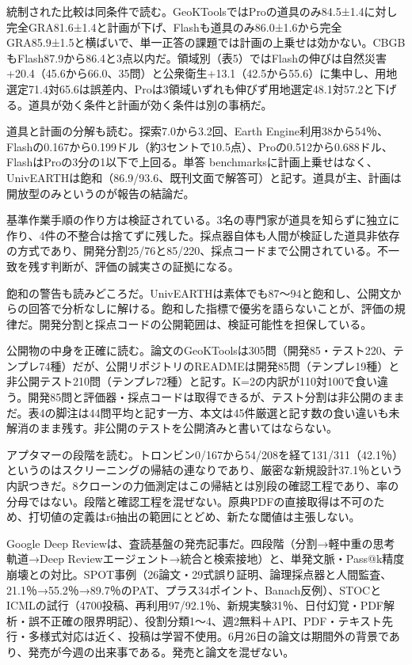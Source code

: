 \documentclass[lualatex,a4paper,10pt]{jlreq}
\begin{document}
統制された比較は同条件で読む。GeoKToolsではProの道具のみ84.5±1.4に対し完全GRA81.6±1.4と計画が下げ、Flashも道具のみ86.0±1.6から完全GRA85.9±1.5と横ばいで、単一正答の課題では計画の上乗せは効かない。CBGBもFlash87.9から86.4と3点以内だ。領域別（表5）ではFlashの伸びは自然災害+20.4（45.6から66.0、35問）と公衆衛生+13.1（42.5から55.6）に集中し、用地選定71.4対65.6は誤差内、Proは3領域いずれも伸びず用地選定48.1対57.2と下げる。道具が効く条件と計画が効く条件は別の事柄だ。
\cite{B47,B84,B48}


道具と計画の分解も読む。探索7.0から3.2回、Earth Engine利用38から54％、Flashの0.167から0.199ドル（約3セントで10.5点）、Proの0.512から0.688ドル、FlashはProの3分の1以下で上回る。単答 benchmarksに計画上乗せはなく、UnivEARTHは飽和（86.9/93.6、既刊文面で解答可）と記す。道具が主、計画は開放型のみというのが報告の結論だ。
\cite{B47,B84,B48}


基準作業手順の作り方は検証されている。3名の専門家が道具を知らずに独立に作り、4件の不整合は捨てずに残した。採点器自体も人間が検証した道具非依存の方式であり、開発分割25/76と85/220、採点コードまで公開されている。不一致を残す判断が、評価の誠実さの証拠になる。
\cite{B47,B84,B48}


飽和の警告も読みどころだ。UnivEARTHは素体でも87〜94と飽和し、公開文からの回答で分析なしに解ける。飽和した指標で優劣を語らないことが、評価の規律だ。開発分割と採点コードの公開範囲は、検証可能性を担保している。
\cite{B47,B84,B48}


公開物の中身を正確に読む。論文のGeoKToolsは305問（開発85・テスト220、テンプレ74種）だが、公開リポジトリのREADMEは開発85問（テンプレ19種）と非公開テスト210問（テンプレ72種）と記す。K=2の内訳が110対100で食い違う。開発85問と評価器・採点コードは取得できるが、テスト分割は非公開のままだ。表4の脚注は44問平均と記す一方、本文は45件厳選と記す数の食い違いも未解消のまま残す。非公開のテストを公開済みと書いてはならない。
\cite{B47,B84,B48,B61}


アプタマーの段階を読む。トロンビン0/167から54/208を経て131/311（42.1％）というのはスクリーニングの帰結の連なりであり、厳密な新規設計37.1％という内訳つきだ。8クローンの力価測定はこの帰結とは別段の確認工程であり、率の分母ではない。段階と確認工程を混ぜない。原典PDFの直接取得は不可のため、打切値の定義はr6抽出の範囲にとどめ、新たな閾値は主張しない。
\cite{B46,B83,B44,B43,B45}


Google Deep Reviewは、査読基盤の発売記事だ。四段階（分割→軽中重の思考軌道→Deep Reviewエージェント→統合と検索接地）と、単発文脈・Pass@k精度崩壊との対比。SPOT事例（26論文・29式誤り証明、論理採点器と人間監査、21.1％→55.2％→89.7％のPAT、プラス34ポイント、Banach反例）、STOCとICMLの試行（4700投稿、再利用97/92.1％、新規実験31％、日付幻覚・PDF解析・誤不正確の限界明記）、役割分類1〜4、週2無料＋API、PDF・テキスト先行・多様式対応は近く、投稿は学習不使用。6月26日の論文は期間外の背景であり、発売が今週の出来事である。発売と論文を混ぜない。
\cite{B50,B85,B49}
\end{document}
